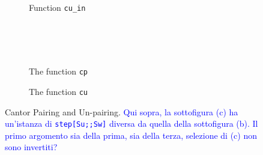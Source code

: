 \documentclass[preprint]{elsarticle}
\theoremstyle{remark}
\begin{document}
\begin{figure}
\begin{subfigure}{.975\textwidth}
\label{sfig:cu step y = 0}
\end{subfigure}
\\ \\ \\
\begin{subfigure}{.975\textwidth}
\centering
{}
\caption{Function \lstinline|cu_in|}
\label{sfig:cu input}
\end{subfigure}
\\ \\ \\
\begin{subfigure}{.665\textwidth}
    \centering
{}
\caption{The function \lstinline|cp|}
\label{sfig:cp}
\end{subfigure}
\hfill
\begin{subfigure}{.325\textwidth}
\centering
{}
\caption{The function \lstinline|cu|}
\label{sfig:cu}
\end{subfigure}
\caption{Cantor Pairing and Un-pairing.  \textcolor{blue}{Qui sopra, la sottofigura (c) ha un'istanza di \texttt{step[Su;;Sw]} diversa da quella della sottofigura (b). Il primo argomento sia della prima, sia della terza, selezione di (c) non sono invertiti?}}
\label{fig:Cantor}
\end{figure}
\end{document}
